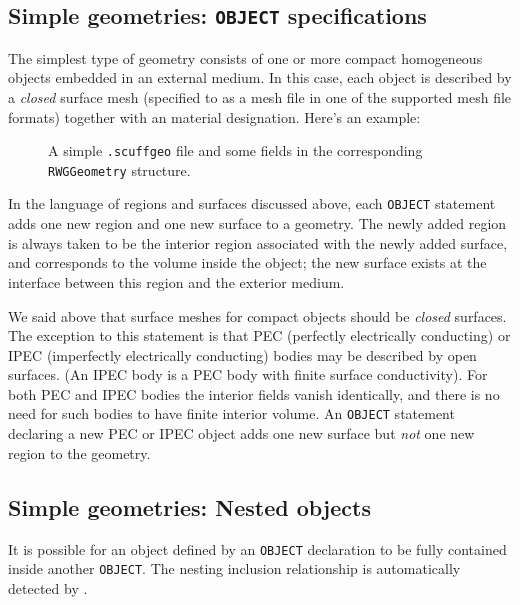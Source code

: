 \subsection*{Simple geometries: \texttt{OBJECT} specifications}

The simplest type of \lss geometry consists of one or more
compact homogeneous objects embedded in an external 
medium. In this case, each object is described by a 
\textit{closed} surface mesh (specified to \lss
as a mesh file in one of the supported mesh file 
formats) together with an material designation.
Here's an example:
\begin{figure}[H]
\begin{center}
\caption{A simple \texttt{.scuffgeo} file and some fields in the 
         corresponding \texttt{RWGGeometry} structure.}
\end{center}
\end{figure}

In the language of regions and surfaces discussed above,
each \texttt{OBJECT} statement adds one new region and 
one new surface to a geometry. The newly added region 
is always taken to be the interior region associated
with the newly added surface, and corresponds to the
volume inside the object; the new surface exists at 
the interface between this region and the exterior
medium.

We said above that surface meshes for compact objects 
should be \textit{closed} surfaces. The exception to 
this statement is that PEC (perfectly electrically
conducting) or IPEC (imperfectly electrically 
conducting) bodies may be described by open surfaces.
(An IPEC body is a PEC body with finite surface 
conductivity). For both PEC and IPEC bodies the
interior fields vanish identically, and there
is no need for such bodies to have finite
interior volume. An \texttt{OBJECT} statement 
declaring a new PEC or IPEC object adds one new surface
but \textit{not} one new region to the geometry.

\subsection*{Simple geometries: Nested objects} 

It is possible for an object defined by an
\texttt{OBJECT} declaration to be fully 
contained inside another \texttt{OBJECT}. 
The nesting inclusion relationship is automatically 
detected by \ls. 

